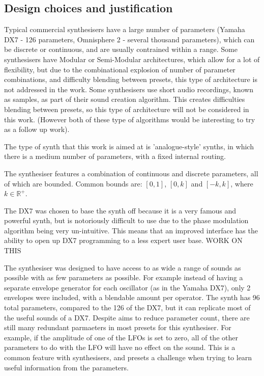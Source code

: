 \documentclass[11pt, oneside]{report}   	%
\begin{document}
\subsection{Design choices and justification}
Typical commercial synthesisers have a large number of parameters (Yamaha DX7 - 126 parameters, Omnisphere 2 - several thousand parameters), which can be discrete or continuous, and are usually contrained within a range. Some synthesisers have Modular or Semi-Modular architectures, which allow for a lot of flexibility, but due to the combinational explosion of number of parameter combinations, and difficulty blending between presets, this type of architecture is not addressed in the work.
Some synthesisers use short audio recordings, known as samples, as part of their sound creation algorithm. This creates difficulties blending between presets, so this type of architecture will not be considered in this work. (However both of these type of algorithms would be interesting to try as a follow up work).

The type of synth that this work is aimed at is 'analogue-style' synths, in which there is a medium number of parameters, with a fixed internal routing. 

The synthesiser features a combination of continuous and discrete parameters, all of which are bounded. Common bounds are: $[0, 1]$, $[0, k]$ and $[-k, k]$, where $k \in \mathbb{R}^+ $.

The DX7 was chosen to base the synth off because it is a very famous and powerful synth, but is notoriously difficult to use due to the phase modulation algorithm being very un-intuitive. This means that an improved interface has the ability to open up DX7 programming to a less expert user base. WORK ON THIS

The synthesiser was designed to have access to as wide a range of sounds as possible with as few parameters as possible. For example instead of having a separate envelope generator for each oscillator (as in the Yamaha DX7), only 2 envelopes were included, with a blendable amount per operator. The synth has 96 total parameters, compared to the 126 of the DX7, but it can replicate most of the useful sounds of a DX7. Despite aims to reduce parameter count, there are still many redundant parmaeters in most presets for this synthesiser. For example, if the amplitude of one of the LFOs is set to zero, all of the other parameters to do with the LFO will have no effect on the sound. This is a common feature with synthesisers, and presets a challenge when trying to learn useful information from the parameters.
\end{document}
